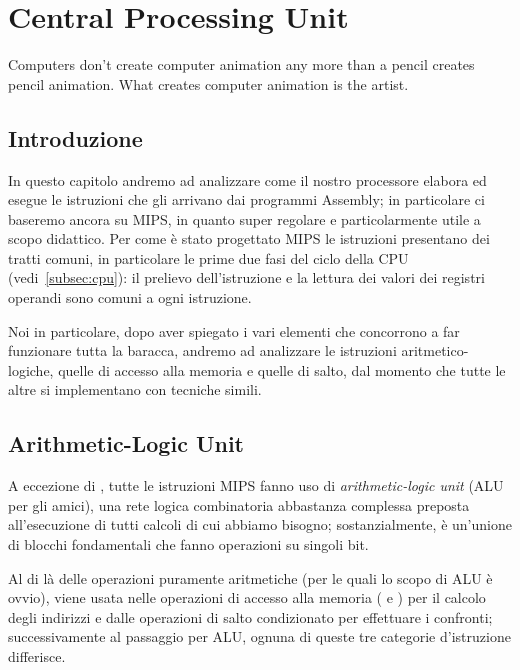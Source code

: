 



\chapter{Central Processing Unit}\begin{fquote}Computers don't create computer animation any more than a pencil creates pencil animation. What creates computer animation is the artist.
 \end{fquote}

\section{Introduzione}
In questo capitolo andremo ad analizzare come il nostro processore elabora ed esegue le istruzioni che gli arrivano dai programmi Assembly; in particolare ci baseremo ancora su MIPS, in quanto super regolare e particolarmente utile a scopo didattico. Per come è stato progettato MIPS le istruzioni presentano dei tratti comuni, in particolare le prime due fasi del ciclo della CPU (vedi~\ref{subsec:cpu}): il prelievo dell'istruzione e la lettura dei valori dei registri operandi sono comuni a ogni istruzione.

Noi in particolare, dopo aver spiegato i vari elementi che concorrono a far funzionare tutta la baracca, andremo ad analizzare le istruzioni aritmetico-logiche, quelle di accesso alla memoria e quelle di salto, dal momento che tutte le altre si implementano con tecniche simili.

\section{Arithmetic-Logic Unit}
A eccezione di , tutte le istruzioni MIPS fanno uso di \emph{arithmetic-logic unit} (ALU per gli amici), una rete logica combinatoria abbastanza complessa preposta all'esecuzione di tutti calcoli di cui abbiamo bisogno; sostanzialmente, è un’unione di blocchi fondamentali che fanno operazioni su singoli bit.

Al di là delle operazioni puramente aritmetiche (per le quali lo scopo di ALU è ovvio), viene usata nelle operazioni di accesso alla memoria ( e ) per il calcolo degli indirizzi e dalle operazioni di salto condizionato per effettuare i confronti; successivamente al passaggio per ALU, ognuna di queste tre categorie d'istruzione differisce.

